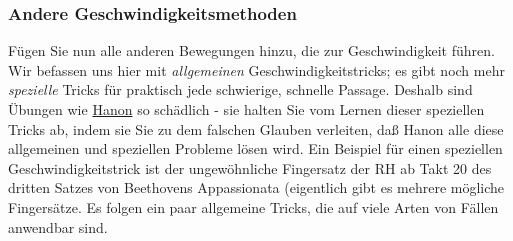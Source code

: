 \subsubsection{Andere Geschwindigkeitsmethoden}\hypertarget{c1iii7iAndere}{}

Fügen Sie nun alle anderen Bewegungen hinzu, die zur Geschwindigkeit führen.
Wir befassen uns hier mit \textit{allgemeinen} Geschwindigkeitstricks; es gibt noch mehr \textit{spezielle} Tricks für praktisch jede schwierige, schnelle Passage.
Deshalb sind Übungen wie \hyperlink{c1iii7h}{Hanon} so schädlich - sie halten Sie vom Lernen dieser speziellen Tricks ab, indem sie Sie zu dem falschen Glauben verleiten, daß Hanon alle diese allgemeinen und speziellen Probleme lösen wird.
Ein Beispiel für einen speziellen Geschwindigkeitstrick ist der ungewöhnliche Fingersatz der RH ab Takt 20 des dritten Satzes von Beethovens Appassionata (eigentlich gibt es mehrere mögliche Fingersätze.
Es folgen ein paar allgemeine Tricks, die auf viele Arten von Fällen anwendbar sind.

